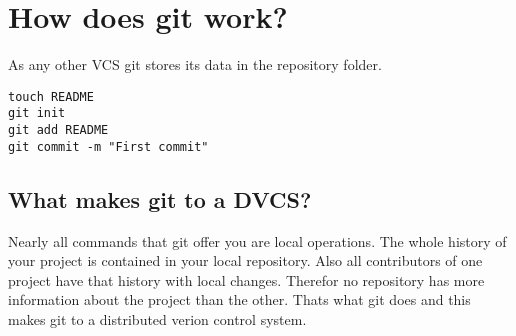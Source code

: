 \section{How does git work?}

As any other VCS git stores its data in the repository folder. 

\begin{lstlisting}
touch README
git init
git add README
git commit -m "First commit"
\end{lstlisting}


\subsection {What makes git to a DVCS?}

Nearly all commands that git offer you are local operations. The whole history of your project is contained in your local repository. Also all contributors of one project have that history with local changes. Therefor no repository has more information about the project than the other. Thats what git does and this makes git to a distributed verion control system.